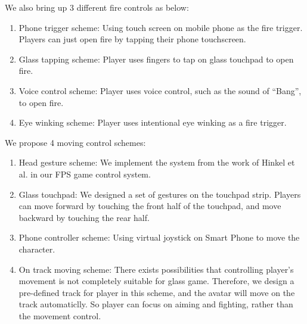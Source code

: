 \documentclass{acm_proc_article-sp}
\begin{document}
We also bring up 3 different fire controls as below:

\begin{enumerate}
\item Phone trigger scheme: Using touch screen on mobile phone as the fire trigger. Players can just open fire by tapping their phone touchscreen.

\item Glass tapping scheme: Player uses fingers to tap on glass touchpad to open fire.

\item Voice control scheme: Player uses voice control, such as the sound of ``Bang'', to open fire.

\item Eye winking scheme: Player uses intentional eye winking as a fire trigger.
\end{enumerate}

We propose 4 moving control schemes:

\begin{enumerate}
\item Head gesture scheme: We implement the system from the work of Hinkel et al.\cite{wheel} in our FPS game control system.

\item Glass touchpad: We designed a set of gestures on the touchpad strip. Players can move forward by touching the front half of the touchpad, and move backward by touching the rear half.

\item Phone controller scheme: Using virtual joystick on Smart Phone to move the character.

\item On track moving scheme: There exists possibilities that controlling player's movement is not completely suitable for glass game. Therefore, we design a pre-defined track for player in this scheme, and the avatar will move on the track automaticlly. So player can focus on aiming and fighting, rather than the movement control.
\end{enumerate}
\end{document}
